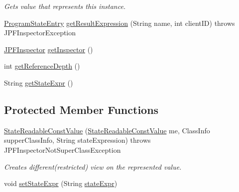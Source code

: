 \begin{DoxyCompactItemize}
\begin{DoxyCompactList}\small\item\em Gets value that represents this instance. \end{DoxyCompactList}\item 
\hyperlink{classgov_1_1nasa_1_1jpf_1_1inspector_1_1common_1_1pse_1_1_program_state_entry}{Program\+State\+Entry} \hyperlink{classgov_1_1nasa_1_1jpf_1_1inspector_1_1server_1_1programstate_1_1_state_readable_const_value_ab15980cc4034190d1f1cccf6dfbc22fe}{get\+Result\+Expression} (String name, int client\+ID)  throws J\+P\+F\+Inspector\+Exception 
\item 
\hyperlink{classgov_1_1nasa_1_1jpf_1_1inspector_1_1server_1_1jpf_1_1_j_p_f_inspector}{J\+P\+F\+Inspector} \hyperlink{classgov_1_1nasa_1_1jpf_1_1inspector_1_1server_1_1programstate_1_1_state_node_af07846313e0632df18008b5bf571f805}{get\+Inspector} ()
\item 
int \hyperlink{classgov_1_1nasa_1_1jpf_1_1inspector_1_1server_1_1programstate_1_1_state_node_af59b1ac0319251e657293c810a16cdd9}{get\+Reference\+Depth} ()
\item 
String \hyperlink{classgov_1_1nasa_1_1jpf_1_1inspector_1_1server_1_1programstate_1_1_state_node_a54c1c8d91f93c078171589f844252bdf}{get\+State\+Expr} ()
\end{DoxyCompactItemize}
\subsection*{Protected Member Functions}
\begin{DoxyCompactItemize}
\item 
\hyperlink{classgov_1_1nasa_1_1jpf_1_1inspector_1_1server_1_1programstate_1_1_state_readable_const_value_a9ac05422d25102d3bbba73d36df500e3}{State\+Readable\+Const\+Value} (\hyperlink{classgov_1_1nasa_1_1jpf_1_1inspector_1_1server_1_1programstate_1_1_state_readable_const_value}{State\+Readable\+Const\+Value} me, Class\+Info supper\+Class\+Info, String state\+Expression)  throws J\+P\+F\+Inspector\+Not\+Super\+Class\+Exception 
\begin{DoxyCompactList}\small\item\em Creates different(restricted) view on the represented value. \end{DoxyCompactList}\item 
void \hyperlink{classgov_1_1nasa_1_1jpf_1_1inspector_1_1server_1_1programstate_1_1_state_node_a7ed75cc4ba543123c95e506db6f7b84c}{set\+State\+Expr} (String \hyperlink{classgov_1_1nasa_1_1jpf_1_1inspector_1_1server_1_1programstate_1_1_state_node_a784a38d8edeb54f871891cb63de85585}{state\+Expr})
\end{DoxyCompactItemize}
